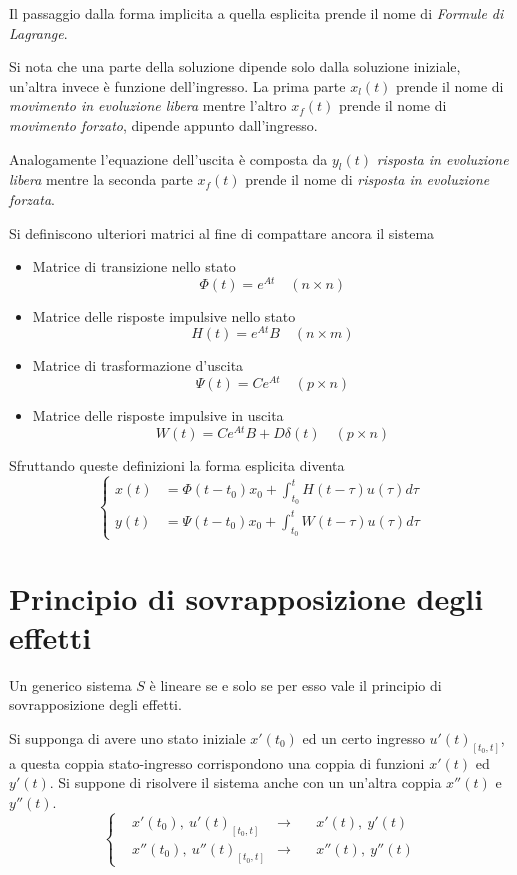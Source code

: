 Il passaggio dalla forma implicita a quella esplicita prende il nome di
\textit{Formule di Lagrange}.

Si nota che una parte della soluzione dipende solo dalla soluzione iniziale,
un'altra invece è funzione dell'ingresso.
La prima parte $x_l(t)$ prende il nome di \textit{movimento in evoluzione
libera} mentre l'altro $x_f(t)$ prende il nome di \textit{movimento forzato},
dipende appunto dall'ingresso.

Analogamente l'equazione dell'uscita è composta da $y_l(t)$ \textit{risposta in
evoluzione libera} mentre la seconda parte $x_f(t)$ prende il nome di
\textit{risposta in evoluzione forzata}.

Si definiscono ulteriori matrici al fine di compattare ancora il sistema
\begin{itemize}
\item Matrice di transizione nello stato
$$
\Phi(t) = e^{At}\quad (n\times n)
$$
\item Matrice delle risposte impulsive nello stato
$$
H(t) = e^{At}B \quad (n\times m)
$$
\item Matrice di trasformazione d'uscita
$$
\Psi(t) = Ce^{At} \quad (p\times n)
$$
\item Matrice delle risposte impulsive in uscita
$$
W(t) = Ce^{At}B + D\delta(t) \quad (p\times n)
$$
\end{itemize}
Sfruttando queste definizioni la forma esplicita diventa
$$\left\{\begin{aligned}
x(t) &= \Phi(t-t_0) x_0 + \int_{t_0}^t H(t-\tau)u(\tau)d\tau \\
y(t) &= \Psi(t-t_0) x_0 + \int_{t_0}^t W(t-\tau)u(\tau)d\tau
\end{aligned}\right.
$$

\newpage
\section{Principio di sovrapposizione degli effetti}
Un generico sistema $S$ è lineare se e solo se per esso vale il principio di
sovrapposizione degli effetti.

Si supponga di avere uno stato iniziale $x'(t_0)$ ed un certo ingresso
$u'(t)_{[t_0,t]}$, a questa coppia stato-ingresso corrispondono una coppia di
funzioni $x'(t)$ ed $y'(t)$.
Si suppone di risolvere il sistema anche con un un'altra coppia $x''(t)$ e
$y''(t)$.
$$\left\{\begin{aligned}
&x'(t_0),\ u'(t)_{[t_0,t]} &\longrightarrow\quad &x'(t),\ y'(t) \\
&x''(t_0),\ u''(t)_{[t_0,t]} &\longrightarrow\quad & x''(t),\ y''(t)
\end{aligned}\right.
$$

